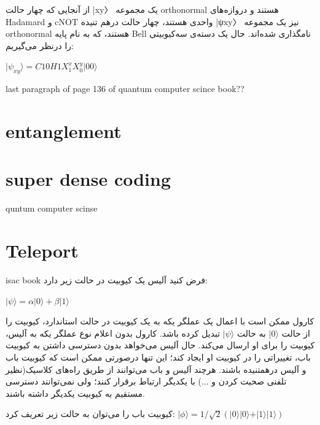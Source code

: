 \documentclass{book}
\begin{document}
از آنجایی که چهار حالت |xy〉 یک مجموعه orthonormal هستند و دروازه‌های Hadamard و cNOT واحدی هستند، چهار حالت درهم تنیده |ψxy〉 نیز یک مجموعه orthonormal هستند، که به نام پایه Bell نامگذاری شده‌اند. حال یک دسته‌ی سه‌کیوبیتی را درنظر ‌می‌گیریم:

\begin{center}
$\vert \psi_{xy}\rangle = C10H1X^{x}_{1} X^{y}_{0} \vert00\rangle$\\
\end{center}

last paragraph of page 136 of quantum computer scince book??\\
\section{entanglement}
\section{super dense coding}
quntum computer scinse
\section{Teleport}
isac book
فرض کنید آلیس یک کیوبیت در حالت زیر دارد:
\begin{center}
$\vert \psi \rangle = \alpha\vert 0 \rangle + \beta\vert 1 \rangle $\\	
\end{center}

	کارول ممکن است با اعمال یک عملگر یکه‌ به یک کیوبیت در حالت استاندارد، کیوبیت را از حالت $\vert0\rangle$ به حالت $\vert\psi\rangle$  تبدیل کرده باشد. کارول بدون اعلام نوع عملگر یکه به آلیس،‌ کیوبیت را برای او ارسال می‌کند. 
	حال آلیس می‌خواهد بدون دسترسی داشتن به کیوبیت باب، تغییراتی را در کیوبیت او ایجاد کند؛ این تنها درصورتی ممکن است که کیوبیت باب و آلیس درهمتنیده باشند. هرچند آلیس و باب می‌توانند از طریق راه‌های کلاسیک(نظیر تلفنی صحبت کردن و ...) با یکدیگر ارتباط برقرار کنند؛ ولی نمی‌توانند دسترسی مستقیم به کیوبیت یکدیگر داشته باشند. 
	
	کیوبیت باب را می‌توان به حالت زیر تعریف کرد:
$\vert\phi\rangle = 1/\sqrt{2}(\vert0\rangle \vert0\rangle + \vert1\rangle\vert1\rangle)$ 
	
\end{document}
